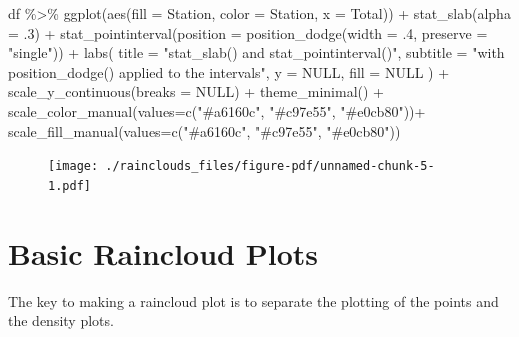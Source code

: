\documentclass[
  letterpaper,
  DIV=11,
  numbers=noendperiod]{scrreprt}
\newenvironment{Shaded}{\begin{snugshade}}{\end{snugshade}}
\newcommand{\AttributeTok}[1]{\textcolor[rgb]{0.40,0.45,0.13}{#1}}
\newcommand{\ConstantTok}[1]{\textcolor[rgb]{0.56,0.35,0.01}{#1}}
\newcommand{\DecValTok}[1]{\textcolor[rgb]{0.68,0.00,0.00}{#1}}
\newcommand{\FunctionTok}[1]{\textcolor[rgb]{0.28,0.35,0.67}{#1}}
\newcommand{\NormalTok}[1]{\textcolor[rgb]{0.00,0.23,0.31}{#1}}
\newcommand{\SpecialCharTok}[1]{\textcolor[rgb]{0.37,0.37,0.37}{#1}}
\newcommand{\StringTok}[1]{\textcolor[rgb]{0.13,0.47,0.30}{#1}}
\begin{document}
\begin{Shaded}
\begin{Highlighting}[]
\NormalTok{df }\SpecialCharTok{\%\textgreater{}\%}
  \FunctionTok{ggplot}\NormalTok{(}\FunctionTok{aes}\NormalTok{(}\AttributeTok{fill =}\NormalTok{ Station, }\AttributeTok{color =}\NormalTok{ Station, }\AttributeTok{x =}\NormalTok{ Total)) }\SpecialCharTok{+}
  \FunctionTok{stat\_slab}\NormalTok{(}\AttributeTok{alpha =}\NormalTok{ .}\DecValTok{3}\NormalTok{) }\SpecialCharTok{+}
  \FunctionTok{stat\_pointinterval}\NormalTok{(}\AttributeTok{position =} \FunctionTok{position\_dodge}\NormalTok{(}\AttributeTok{width =}\NormalTok{ .}\DecValTok{4}\NormalTok{, }\AttributeTok{preserve =} \StringTok{"single"}\NormalTok{)) }\SpecialCharTok{+}
  \FunctionTok{labs}\NormalTok{(}
    \AttributeTok{title =} \StringTok{"stat\_slab() and stat\_pointinterval()"}\NormalTok{,}
    \AttributeTok{subtitle =} \StringTok{"with position\_dodge() applied to the intervals"}\NormalTok{,}
    \AttributeTok{y =} \ConstantTok{NULL}\NormalTok{,}
    \AttributeTok{fill =} \ConstantTok{NULL}
\NormalTok{  ) }\SpecialCharTok{+}
  \FunctionTok{scale\_y\_continuous}\NormalTok{(}\AttributeTok{breaks =} \ConstantTok{NULL}\NormalTok{) }\SpecialCharTok{+}
  \FunctionTok{theme\_minimal}\NormalTok{() }\SpecialCharTok{+}
  \FunctionTok{scale\_color\_manual}\NormalTok{(}\AttributeTok{values=}\FunctionTok{c}\NormalTok{(}\StringTok{"\#a6160c"}\NormalTok{, }\StringTok{"\#c97e55"}\NormalTok{, }\StringTok{"\#e0cb80"}\NormalTok{))}\SpecialCharTok{+}
  \FunctionTok{scale\_fill\_manual}\NormalTok{(}\AttributeTok{values=}\FunctionTok{c}\NormalTok{(}\StringTok{"\#a6160c"}\NormalTok{, }\StringTok{"\#c97e55"}\NormalTok{, }\StringTok{"\#e0cb80"}\NormalTok{))}
\end{Highlighting}
\end{Shaded}

\begin{figure}[H]

{\centering \texttt{[image: ./rainclouds\_files/figure-pdf/unnamed-chunk-5-1.pdf]}

}

\end{figure}

\hypertarget{basic-raincloud-plots-1}{%
\section{Basic Raincloud Plots}\label{basic-raincloud-plots-1}}

The key to making a raincloud plot is to separate the plotting of the
points and the density plots.
\end{document}
